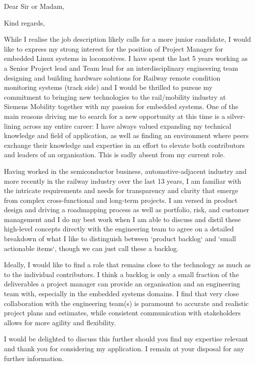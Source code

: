 \documentclass[10pt,a4paper]{moderncv}
\begin{document}
\date{\today}

\opening{Dear Sir or Madam,}
\closing{Kind regards,}

\makeletterhead

While I realise the job description likely calls for a more junior candidate, I would like to express my strong interest for the position of Project Manager for embedded Linux systems in locomotives. I have spent the last 5 years working as a Senior Project lead and Team lead for an interdisciplinary engineering team designing and building hardware solutions for Railway remote condition monitoring systems (track side) and I would be thrilled to pursue my commitment to bringing new technologies to the rail/mobility industry at Siemens Mobility together with my passion for embedded systems. One of the main reasons driving me to search for a new opportunity at this time is a silver-lining across my entire career: I have always valued expanding my technical knowledge and field of application, as well as finding an environment where peers exchange their knowledge and expertise in an effort to elevate both contributors and leaders of an organisation. This is sadly absent from my current role.

\vspace{1em}
\par\noindent Having worked in the semiconductor business, automotive-adjacent industry and more recently in the railway industry over the last 13 years, I am familiar with the intricate requirements and needs for transparency and clarity that emerge from complex cross-functional and long-term projects. I am versed in product design and driving a roadmapping process as well as portfolio, risk, and customer management and I do my best work when I am able to discuss and distil these high-level concepts directly with the engineering team to agree on a detailed breakdown of what I like to distinguish between `product backlog` and `small actionable items`, though we can just call these a backlog.

\vspace{1em}
\par\noindent Ideally, I would like to find a role that remains close to the technology as much as to the individual contributors. I think a backlog is only a small fraction of the deliverables a project manager can provide an organisation and an engineering team with, especially in the embedded systems domains. I find that very close collaboration with the engineering team(s) is paramount to accurate and realistic project plans and estimates, while consistent communication with stakeholders allows for more agility and flexibility.

\vspace{1em}
\par\noindent I would be delighted to discuss this further should you find my expertise relevant and thank you for considering my application. I remain at your disposal for any further information.

\makeletterclosing
\end{document}

